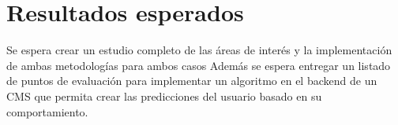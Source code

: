 \documentclass{udparticle}
\begin{document}
\section{Resultados esperados}

Se espera crear un estudio completo de las áreas de interés y la implementación de ambas metodologías para ambos casos
Además se espera entregar un listado de puntos de evaluación para implementar un algoritmo en el backend de un CMS que permita crear las predicciones
del usuario basado en su comportamiento.



  
% 


 
\end{document}
